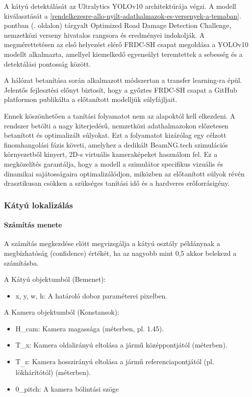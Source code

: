 A kátyú detektálását az Ultralytics YOLOv10 architektúrája végzi. A modell kiválasztását a  \ref{rendelkezesre-allo-nyilt-adathalmazok-es-versenyek-a-temaban}. pontban (\pageref{rendelkezesre-allo-nyilt-adathalmazok-es-versenyek-a-temaban}. oldalon) tárgyalt Optimized Road Damage Detection Challenge, nemzetközi verseny hivatalos rangsora és eredményei indokolják. A megmérettetésen az első helyezést elérő FRDC-SH csapat megoldása a YOLOv10 modellt alkalmazta, amellyel kiemelkedő egyensúlyt teremtettek a sebesség és a detektálási pontosság között.

A hálózat betanítása során alkalmazott módszertan a transfer learning-ra épül. Jelentős fejlesztési előnyt biztosít, hogy a győztes FRDC-SH csapat a GitHub platformon publikálta a előtanított modelljük súlyfájljait.  

Ennek köszönhetően a tanítási folyamatot nem az alapoktól kell elkezdeni. A rendszer betölti a nagy kiterjedésű, nemzetközi adathalmazokon előzetesen betanított és optimalizált súlyokat. Ezt a folyamatot kizárólag egy célzott finomhangolási fázis követi, amelyhez a dedikált BeamNG.tech szimulációs környezetből kinyert, 2D-s virtuális kameraképeket használom fel. Ez a megközelítés garantálja, hogy a modell a szimulátor specifikus vizuális és dinamikai sajátosságaira optimalizálódjon, miközben az előtanított súlyok révén drasztikusan csökken a szükséges tanítási idő és a hardveres erőforrásigény.

\subsubsection{Kátyú lokalizálás}

\paragraph{Számítás menete}

A számítás megkezdése elött megvizsgálja a kátyú osztály példánynak a
megbízhatóság (confidence) értékét, ha az nagyobb mint 0,5 akkor
belekezd a számításba.

A Kátyú objektumból (Bemenet):

\begin{itemize}
\item
  x, y, w, h: A határoló doboz paraméterei pixelben.
\end{itemize}

A Kamera objektumból (Konstansok):

\begin{itemize}
\item
  H\_cam: Kamera magassága (méterben, pl. 1.45).
\item
  T\_x: Kamera oldalirányú eltolása a jármű középpontjától (méterben).
\item
  T\textsubscript{\_}z: Kamera hosszirányú eltolása a jármű
  referenciapontjától (pl. lökhárítótól) (méterben).
\item
  0\_pitch: A kamera bólintási szöge
\end{itemize}

